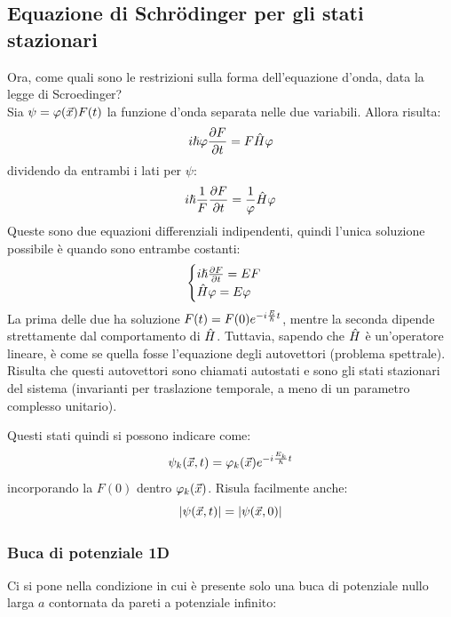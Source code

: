 \subsection{Equazione di Schrödinger per gli stati stazionari} 

Ora, come quali sono le restrizioni sulla forma dell'equazione d'onda, data la legge di Scroedinger?\\
Sia $\psi = \varphi(\vec x) F(t)$ la funzione d'onda separata nelle due variabili. Allora risulta:
\[
    i\hslash \varphi\frac{\partial F}{\partial t} = F\hat{H}\varphi \]\[
\]
dividendo da entrambi i lati per $\psi$:
\[
    i\hslash\frac{1}{F}\frac{\partial F}{\partial t} = \frac{1}{\varphi}\hat{H}\varphi
\]
Queste sono due equazioni differenziali indipendenti, quindi l'unica soluzione possibile è quando sono entrambe costanti:
\[
\begin{cases}
    i\hslash \frac{\partial F}{\partial t} = E F\\
    \hat{H}\varphi = E \varphi
\end{cases}
\]
La prima delle due ha soluzione $F(t) = F(0) e^{-i\frac{E}{\hslash}t}$, mentre la seconda dipende strettamente dal comportamento di $\hat{H}$. Tuttavia, sapendo che $\hat{H}$ è un'operatore lineare, è come se quella fosse l'equazione degli autovettori (problema spettrale). Risulta che questi autovettori sono chiamati autostati e sono gli stati stazionari del sistema (invarianti per traslazione temporale, a meno di un parametro complesso unitario).

Questi stati quindi si possono indicare come:
\[
    \psi_k(\vec x, t) = \varphi_k(\vec x) e^{-i\frac{E_k}{\hslash}t}
\]
incorporando la $F(0)$ dentro $\varphi_k(\vec x)$. Risula facilmente anche:
\[
    |\psi(\vec x,t)| = |\psi(\vec x, 0)|
\]


\subsubsection*{Buca di potenziale 1D} 
Ci si pone nella condizione in cui è presente solo una buca di potenziale nullo larga $a$ contornata da pareti a potenziale infinito:

\begin{figure}[h]
\centering
{}
\end{figure}

